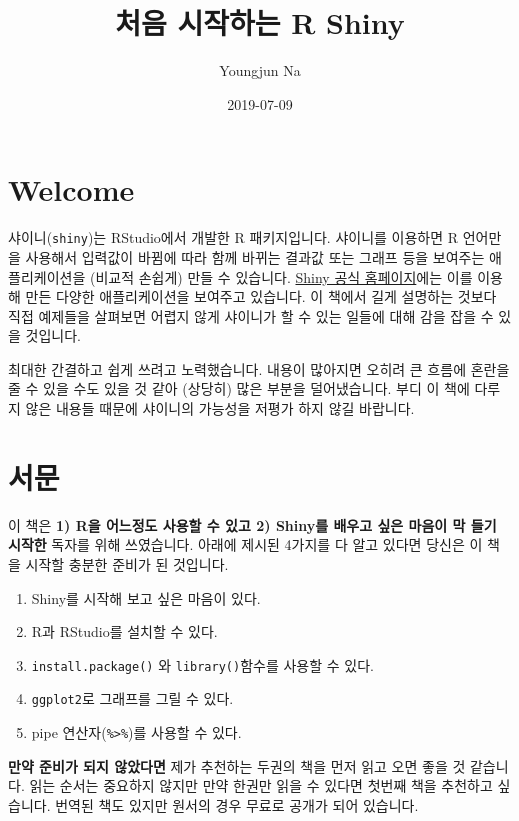 \documentclass[]{book}
\title{처음 시작하는 R Shiny}
\author{Youngjun Na}
\date{2019-07-09}
\providecommand{\tightlist}{%
  \setlength{\itemsep}{0pt}\setlength{\parskip}{0pt}}
\begin{document}
\maketitle

{
\setcounter{tocdepth}{1}
\tableofcontents
}
\chapter*{Welcome}\label{welcome}

샤이니(\texttt{shiny})는 RStudio에서 개발한 R 패키지입니다. 샤이니를
이용하면 R 언어만을 사용해서 입력값이 바뀜에 따라 함께 바뀌는 결과값
또는 그래프 등을 보여주는 애플리케이션을 (비교적 손쉽게) 만들 수
있습니다. \href{https://shiny.rstudio.com/gallery/}{Shiny 공식
홈페이지}에는 이를 이용해 만든 다양한 애플리케이션을 보여주고 있습니다.
이 책에서 길게 설명하는 것보다 직접 예제들을 살펴보면 어렵지 않게
샤이니가 할 수 있는 일들에 대해 감을 잡을 수 있을 것입니다.

최대한 간결하고 쉽게 쓰려고 노력했습니다. 내용이 많아지면 오히려 큰
흐름에 혼란을 줄 수 있을 수도 있을 것 같아 (상당히) 많은 부분을
덜어냈습니다. 부디 이 책에 다루지 않은 내용들 때문에 샤이니의 가능성을
저평가 하지 않길 바랍니다.

\chapter{서문}\label{intro}

이 책은 \textbf{1) R을 어느정도 사용할 수 있고 2) Shiny를 배우고 싶은
마음이 막 들기 시작한} 독자를 위해 쓰였습니다. 아래에 제시된 4가지를 다
알고 있다면 당신은 이 책을 시작할 충분한 준비가 된 것입니다.

\begin{enumerate}
\def\labelenumi{\arabic{enumi}.}
\setcounter{enumi}{-1}
\tightlist
\item
  Shiny를 시작해 보고 싶은 마음이 있다.
\item
  R과 RStudio를 설치할 수 있다.
\item
  \texttt{install.package()} 와 \texttt{library()}함수를 사용할 수 있다.
\item
  \texttt{ggplot2}로 그래프를 그릴 수 있다.
\item
  pipe 연산자(\texttt{\%\textgreater{}\%})를 사용할 수 있다.
\end{enumerate}

\textbf{만약 준비가 되지 않았다면} 제가 추천하는 두권의 책을 먼저 읽고
오면 좋을 것 같습니다. 읽는 순서는 중요하지 않지만 만약 한권만 읽을 수
있다면 첫번째 책을 추천하고 싶습니다. 번역된 책도 있지만 원서의 경우
무료로 공개가 되어 있습니다.
\end{document}
